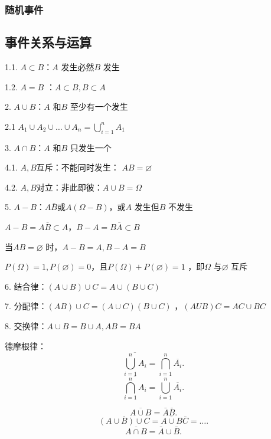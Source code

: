 \subsubsection{随机事件}%
\label{subsub:随机事件}
\subsection{事件关系与运算}%
\label{sub:事件关系与运算}
1.1. $A\subset B$：$A$ 发生必然$B$ 发生

1.2. $A=B$ ：$A\subset B, B\subset A$ 

2. $A\cup B$：$A$ 和$B$ 至少有一个发生

2.1 $A_1\cup A_2\cup \ldots\cup A_n=\bigcup_{i=1}^{n}A_1$

3. $A\cap B$：$A$ 和$B$ 只发生一个

4.1. $A,B$互斥：不能同时发生： $AB=\varnothing$

4.2. $A,B$对立：非此即彼：$A\cup B=\Omega$

5. $A-B$：$A \bar{B}$或$A(\Omega-B)$，或$A$ 发生但$B$ 不发生
\begin{notation}
    $A-B=A\bar{B}\subset A$，$B-A=B\bar{A}\subset B$

    当$AB=\varnothing$ 时，$A-B= A,B-A=B$
\end{notation}

\begin{notation}
    $P\left( \Omega \right) =1,P\left( \varnothing \right) =0$，且$P\left( \Omega \right) +P\left( \varnothing \right) =1$ ，即$\Omega$ 与$\varnothing$ 互斥
\end{notation}

6. 结合律：$\left( A\cup B \right) \cup C = A\cup \left( B\cup C \right) $

7. 分配律：$\left( AB \right) \cup C=\left( A\cup C \right) \left( B\cup C \right) $ ，$\left( AUB \right) C =AC\cup BC$

8. 交换律：$A\cup B=B\cup A,AB=BA$
\begin{notation}
    德摩根律：\[
    \overline{\bigcup_{i=1}^{n}A_i} = \bigcap_{i=1}^{n}\overline{A_i}
    .\] 
    \[
        \overline{\bigcap_{i=1}^{n}A_i}=\bigcup_{i=1}^{n}\overline{A_i}
    .\] 
\end{notation}
\begin{eg}
     \[
        \overline{A\cup B}=\bar{A}\bar{B}
    .\]
    \[
        \overline{\left( A\cup B \right) \cup C} = \overline{A\cup B}\bar{C}=\ldots
    .\] 
    \[
        \overline{A\cap B}=\bar{A}\cup \bar{B}
    .\] 
\end{eg}
